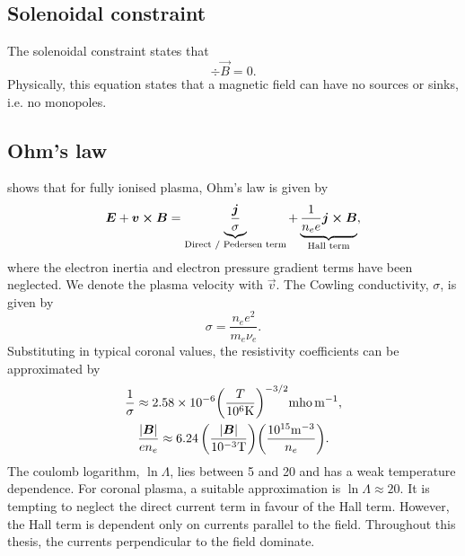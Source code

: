 
\subsection{Solenoidal constraint}

The solenoidal constraint states that
\begin{equation}
    \div{\vec{B}}=0.
\end{equation}
Physically, this equation states that a magnetic field can have no sources or sinks, i.e. no monopoles.

\subsection{Ohm's law}
\label{sec:ohms_law}

\citet{Priest2014} shows that for fully ionised plasma, Ohm's law is given by
\begin{equation}
    \label{eq:ohms_law}
    \vec{E}+\vec{v}\cross\vec{B}=\underbrace{\frac{\vec{j}}{\sigma}}_{\text{Direct / Pedersen term}}+\underbrace{\frac{1}{n_ee}\vec{j}\cross\vec{B}}_{\text{Hall term}},
\end{equation}
where the electron inertia and electron pressure gradient terms have been neglected. We denote the plasma velocity with $\vec{v}$. The Cowling conductivity, $\sigma$, is given by
\begin{equation}
    \sigma = \frac{n_ee^2}{m_e\nu_e}.
\end{equation}
Substituting in typical coronal values, the resistivity coefficients can be approximated by
\begin{gather}
    \frac{1}{\sigma}\approx2.58\times10^{-6}\qty(\frac{T}{10^6\si{.K}})^{-3/2}\si{.mho.m^{-1}},  \\
    \frac{\abs{\vec{B}}}{en_e}\approx6.24\,\qty(\frac{\abs{\vec{B}}}{10^{-3}\si{.T}})\qty(\frac{10^{15}\si{.m^{-3}}}{n_e}).
\end{gather}
The coulomb logarithm, $\ln\Lambda$, lies between 5 and 20 and has a weak temperature dependence. For coronal plasma, a suitable approximation is $\ln\Lambda\approx20$. It is tempting to neglect the direct current term in favour of the Hall term. However, the Hall term is dependent only on currents parallel to the field. Throughout this thesis, the currents perpendicular to the field dominate.

